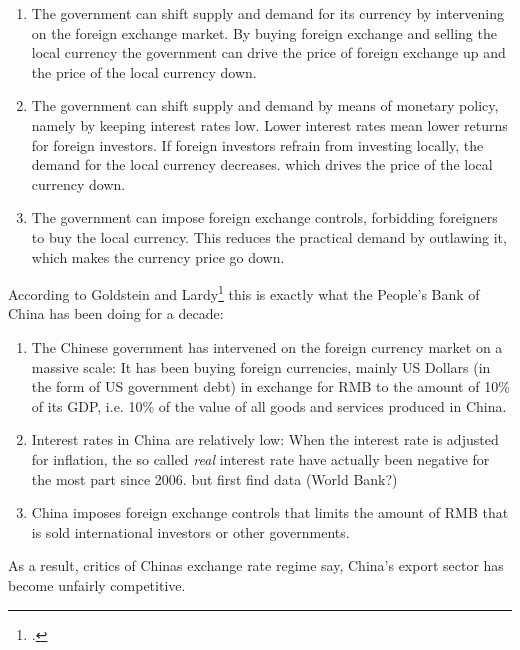 \begin{enumerate}
\item{The government can shift supply and demand for its currency by 
	intervening on the foreign exchange market. By buying foreign 
exchange and selling the local currency the government can drive the 
price of foreign exchange up and the price of the local currency down.}
\item{The government can shift supply and demand by means of monetary 
	policy, namely by keeping interest rates low. Lower interest rates 
mean lower returns for foreign investors. If foreign investors refrain 
from investing locally, the demand for the local currency decreases.  
which drives the price of the local currency down.}
\item{The government can impose foreign exchange controls, forbidding 
	foreigners to buy the local currency. This reduces the practical 
demand by outlawing it, which makes the currency price go down.}
\end{enumerate}

According to Goldstein and Lardy\footnote{\cite[pp.  
40]{Goldstein2008}.} this is exactly what the People's Bank of 
China has been doing for a decade:

\begin{enumerate}
\item{The Chinese government has intervened on the foreign currency 
		market on a massive scale: It has been buying foreign 
		currencies, mainly US Dollars (in the form of US government 
		debt) in exchange for RMB to the amount of 10\% of its GDP, i.e. 
		10\% of the value of all goods and services produced in China.} 
\item{Interest rates in China are relatively low: When the interest rate 
	is adjusted for inflation, the so called \emph{real} interest rate 
have actually been negative for the most part since 2006.} %
but first find data (World Bank?)
\item{China imposes foreign exchange controls that limits the amount of RMB that is sold international investors or other governments.}
\end{enumerate}

As a result, critics of Chinas exchange rate regime say, China's export 
sector has become unfairly competitive. 

